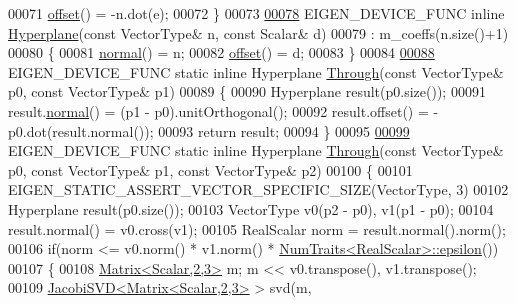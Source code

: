 \begin{DoxyCode}
00071     \hyperlink{group___geometry___module_afe2eadf3679e4a802c0e02c15049aed9}{offset}() = -n.dot(e);
00072   \}
00073 
\hyperlink{group___geometry___module_a1375e9d62e54a5ada49b6367ee2eaa8d}{00078}   EIGEN\_DEVICE\_FUNC \textcolor{keyword}{inline} \hyperlink{group___geometry___module_a1375e9d62e54a5ada49b6367ee2eaa8d}{Hyperplane}(\textcolor{keyword}{const} VectorType& n, \textcolor{keyword}{const} Scalar& d)
00079     : m\_coeffs(n.size()+1)
00080   \{
00081     \hyperlink{group___geometry___module_ad3da930fc7025604f2f174651089b2a8}{normal}() = n;
00082     \hyperlink{group___geometry___module_afe2eadf3679e4a802c0e02c15049aed9}{offset}() = d;
00083   \}
00084 
\hyperlink{group___geometry___module_ae0e7dc262623fc937b1b051595b8d3f1}{00088}   EIGEN\_DEVICE\_FUNC \textcolor{keyword}{static} \textcolor{keyword}{inline} Hyperplane \hyperlink{group___geometry___module_ae0e7dc262623fc937b1b051595b8d3f1}{Through}(\textcolor{keyword}{const} VectorType& p0, \textcolor{keyword}{const} VectorType& p1)
00089   \{
00090     Hyperplane result(p0.size());
00091     result.\hyperlink{group___geometry___module_ad3da930fc7025604f2f174651089b2a8}{normal}() = (p1 - p0).unitOrthogonal();
00092     result.offset() = -p0.dot(result.normal());
00093     \textcolor{keywordflow}{return} result;
00094   \}
00095 
\hyperlink{group___geometry___module_ae105a4f5f2252069b1b1251207dca4e0}{00099}   EIGEN\_DEVICE\_FUNC \textcolor{keyword}{static} \textcolor{keyword}{inline} Hyperplane \hyperlink{group___geometry___module_ae105a4f5f2252069b1b1251207dca4e0}{Through}(\textcolor{keyword}{const} VectorType& p0, \textcolor{keyword}{const} VectorType& p1, \textcolor{keyword}{
      const} VectorType& p2)
00100   \{
00101     EIGEN\_STATIC\_ASSERT\_VECTOR\_SPECIFIC\_SIZE(VectorType, 3)
00102     Hyperplane result(p0.size());
00103     VectorType v0(p2 - p0), v1(p1 - p0);
00104     result.normal() = v0.cross(v1);
00105     RealScalar norm = result.normal().norm();
00106     \textcolor{keywordflow}{if}(norm <= v0.norm() * v1.norm() * \hyperlink{group___core___module_struct_eigen_1_1_num_traits}{NumTraits<RealScalar>::epsilon}())
00107     \{
00108       \hyperlink{group___core___module_class_eigen_1_1_matrix}{Matrix<Scalar,2,3>} m; m << v0.transpose(), v1.transpose();
00109       \hyperlink{group___s_v_d___module_class_eigen_1_1_jacobi_s_v_d}{JacobiSVD<Matrix<Scalar,2,3>} > svd(m, 

\end{DoxyCode}
